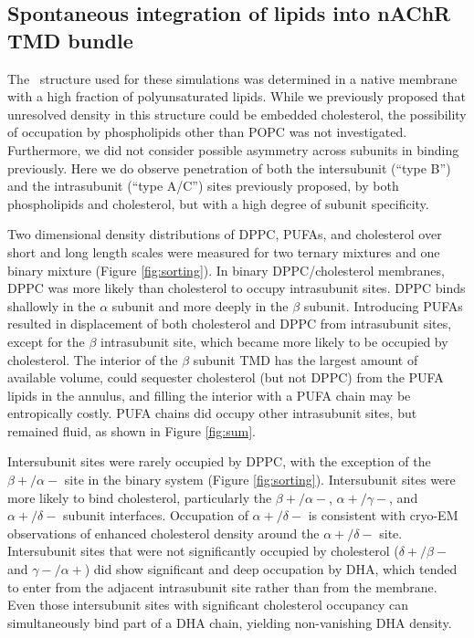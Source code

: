 	\subsection{Spontaneous integration of lipids into nAChR TMD bundle} \label{Embed}

	The \nachr~structure used for these simulations was determined in a native membrane with a high fraction of polyunsaturated lipids. While we previously \cite{Brannigan_Embedded_2008} proposed that unresolved density in this structure could be embedded cholesterol, the possibility of occupation by phospholipids other than POPC was not investigated.  Furthermore, we did not consider possible asymmetry across subunits in binding previously.  Here we do observe penetration of both the intersubunit (``type B'') and the intrasubunit (``type A/C'') sites previously proposed, by both phospholipids and cholesterol, but with a high degree of subunit specificity.  
		
Two dimensional density distributions of DPPC, PUFAs, and cholesterol over short and long length scales were measured for two ternary mixtures and one binary mixture (Figure \ref{fig:sorting}).   In binary DPPC/cholesterol membranes, DPPC was more likely than cholesterol to occupy intrasubunit sites.  DPPC binds shallowly in the $\alpha$ subunit and more deeply in the $\beta$ subunit. Introducing PUFAs resulted in displacement of both cholesterol and DPPC from intrasubunit sites, except for the $\beta$ intrasubunit site, which became more likely to be occupied by cholesterol. The interior of the $\beta$ subunit TMD has the largest amount of available volume, could sequester cholesterol (but not DPPC) from the PUFA lipids in the annulus, and filling the interior with a PUFA chain may be entropically costly.  PUFA chains did occupy other intrasubunit sites, but remained fluid, as shown in Figure \ref{fig:sum}. 

	Intersubunit sites were rarely occupied by DPPC, with the exception of the $\beta+/\alpha-$ site in the binary system (Figure \ref{fig:sorting}). Intersubunit sites were more likely to bind cholesterol, particularly the $\beta+/\alpha-$, $\alpha+/\gamma-$, and $\alpha+/\delta-$ subunit interfaces. Occupation of $\alpha+/\delta-$ is consistent with cryo-EM observations\cite{Unwin_Segregation_2017}  of enhanced cholesterol density around the $\alpha+/\delta-$ site. Intersubunit sites that were not significantly occupied by cholesterol ($\delta+/\beta-$ and $\gamma-/\alpha+$) did show significant and deep occupation by DHA, which tended to enter from the adjacent intrasubunit site rather than from the membrane. Even those intersubunit sites with significant cholesterol occupancy can simultaneously bind part of a DHA chain, yielding non-vanishing DHA density.  
	
